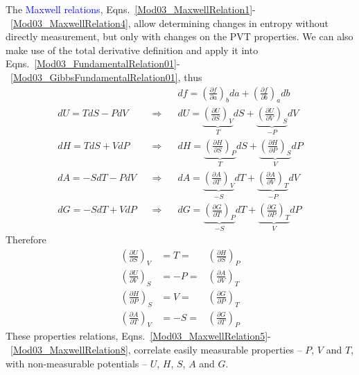 \documentclass[12pts,a4paper,amsmath,amssymb,floatfix]{article}%
\newcommand{\frc}{\displaystyle\frac}
\newcommand{\blue}{\textcolor{blue}}
\begin{document}
The \blue{Maxwell relations}, Eqns.~\ref{Mod03_MaxwellRelation1}-~\ref{Mod03_MaxwellRelation4}, allow determining changes in entropy without directly measurement, but only with changes on the PVT properties. We can also make use of the total derivative definition and apply it into Eqns.~\ref{Mod03_FundamentalRelation01}-~\ref{Mod03_GibbsFundamentalRelation01}, thus
   \begin{eqnarray}
                      &                            & df =  \left(\frc{\partial f}{\partial a}\right)_{b}da + \left(\frc{\partial f}{\partial b}\right)_{a}db \nonumber \\
      dU = TdS - PdV  &\;\;\;\Longrightarrow \;\;\;& dU =  \underbrace{\left(\frc{\partial U}{\partial S}\right)_{V}}_{T}dS + \underbrace{\left(\frc{\partial U}{\partial V}\right)_{S}}_{-P}dV \nonumber \\
      dH = TdS + VdP  &\;\;\;\Longrightarrow \;\;\;& dH =  \underbrace{\left(\frc{\partial H}{\partial S}\right)_{P}}_{T}dS + \underbrace{\left(\frc{\partial H}{\partial P}\right)_{S}}_{V}dP \nonumber \\
      dA = -SdT - PdV &\;\;\;\Longrightarrow \;\;\;& dA =  \underbrace{\left(\frc{\partial A}{\partial T}\right)_{V}}_{-S}dT + \underbrace{\left(\frc{\partial A}{\partial V}\right)_{T}}_{-P}dV \nonumber \\
      dG = -SdT + VdP &\;\;\;\Longrightarrow \;\;\;& dG =  \underbrace{\left(\frc{\partial G}{\partial T}\right)_{P}}_{-S}dT + \underbrace{\left(\frc{\partial G}{\partial P}\right)_{T}}_{V}dP \nonumber 
   \end{eqnarray}
Therefore
   \begin{eqnarray}
       \left(\frc{\partial U}{\partial S}\right)_{V} & =  T = & \left(\frc{\partial H}{\partial S}\right)_{P}\label{Mod03_MaxwellRelation5} \\
       \left(\frc{\partial U}{\partial V}\right)_{S} & = -P = & \left(\frc{\partial A}{\partial V}\right)_{T}\label{Mod03_MaxwellRelation6} \\
       \left(\frc{\partial H}{\partial P}\right)_{S} & =  V = & \left(\frc{\partial G}{\partial P}\right)_{T}\label{Mod03_MaxwellRelation7} \\
       \left(\frc{\partial A}{\partial T}\right)_{V} & = -S = & \left(\frc{\partial G}{\partial T}\right)_{P}\label{Mod03_MaxwellRelation8}
   \end{eqnarray}
These properties relations, Eqns.~\ref{Mod03_MaxwellRelation5}-~\ref{Mod03_MaxwellRelation8}, correlate easily measurable properties -- $P$, $V$ and $T$, with non-measurable potentials -- $U$, $H$, $S$, $A$ and $G$.
\end{document}
